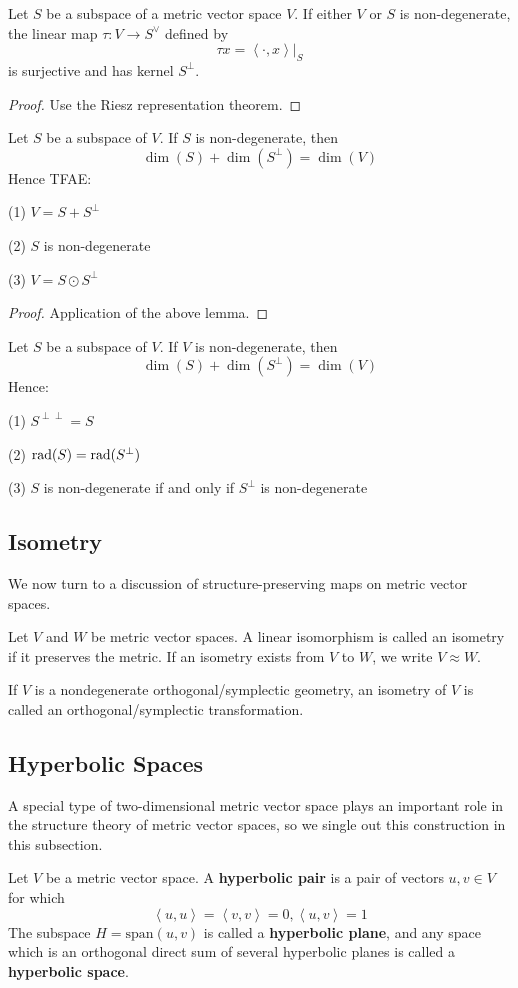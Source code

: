\begin{lemma}
Let $S$ be a subspace of a metric vector space $V$. If either $V$ or $S$ is non-degenerate, the linear map $\tau:V\to S^\vee $ defined by \[\tau x=\left\langle \cdot,x\right\rangle|_S\]
is surjective and has kernel $S^\perp$.
\end{lemma}
\begin{proof}
Use the Riesz representation theorem.
\end{proof}
\begin{theorem}
Let $S$ be a subspace of $V$. If $S$ is non-degenerate, then \[\dim(S)+\dim(S^\perp)=\dim(V)\] Hence TFAE:\par
(1) $V=S+S^\perp$\par
(2) $S$ is non-degenerate\par
(3) $V=S\odot S^\perp$
\end{theorem}
\begin{proof}
Application of the above lemma.
\end{proof}
\begin{theorem}
Let $S$ be a subspace of $V$. If $V$ is non-degenerate, then \[\dim(S)+\dim(S^\perp)=\dim(V)\] Hence:\par
(1) $S^{\perp\perp}=S$\par
(2) $\operatorname{rad}(S)=\operatorname{rad}(S^\perp)$\par
(3) $S$ is non-degenerate if and only if $S^\perp$ is non-degenerate
\end{theorem}
\subsection{Isometry}
We now turn to a discussion of structure-preserving maps on metric vector spaces.
\begin{definition}
Let $V$ and $W$ be metric vector spaces. A linear isomorphism is called an isometry if it preserves the metric. If an isometry exists from $V$ to $W$, we write $V\approx W$.
\end{definition}
\begin{remark}
If $V$ is a nondegenerate orthogonal/symplectic geometry, an isometry of $V$ is called an orthogonal/symplectic transformation.
\end{remark}
\subsection{Hyperbolic Spaces}
A special type of two-dimensional metric vector space plays an important role in the structure theory of metric vector spaces, so we single out this construction in this subsection.
\begin{definition}
Let $V$ be a metric vector space. A \textbf{hyperbolic pair} is a pair of vectors $u,v\in V$ for which \[\left \langle u,u \right \rangle =\left \langle v,v \right \rangle =0,\left \langle u,v \right \rangle=1 \]
The subspace $H=\text{span}(u,v)$ is called a \textbf{hyperbolic plane}, and any space which is an orthogonal direct sum of several hyperbolic planes is called a \textbf{hyperbolic space}. 
\end{definition}


